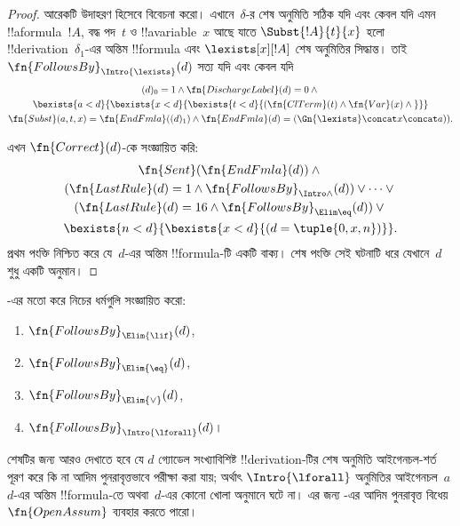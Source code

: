 \documentclass[../../../include/open-logic-section]{subfiles}
\begin{document}
\begin{proof}
  আরেকটি উদাহরণ হিসেবে \Intro{\lexists} বিবেচনা করো। এখানে~$\delta$-র শেষ
  অনুমিতি সঠিক যদি এবং কেবল যদি এমন !!a{formula}~$!A$, বদ্ধ পদ~$t$ ও
  !!a{variable}~$x$ আছে যাতে $\Subst{!A}{t}{x}$ হলো
  !!{derivation}~$\delta_1$-এর অন্তিম !!{formula} এবং $\lexists[x][!A]$ শেষ
  অনুমিতির সিদ্ধান্ত। তাই $\fn{FollowsBy}_{\Intro{\lexists}}(d)$ সত্য যদি এবং
  কেবল যদি
  \begin{multline*}
    (d)_0 = 1 \land \fn{DischargeLabel}(d) = 0 \land {} \\
    \bexists{a < d}{\bexists{x<d}{\bexists{t<d}{
          (\fn{ClTerm}(t) \land \fn{Var}(x)  \land {}}}}\\
    \fn{Subst}(a,t,x) = \fn{EndFmla}((d)_1) \land
    \fn{EndFmla}(d) = (\Gn{\lexists} \concat x \concat a)).
  \end{multline*}

  এখন $\fn{Correct}(d)$-কে সংজ্ঞায়িত করি:
  \begin{multline*}
    \fn{Sent}(\fn{EndFmla}(d)) \land {}\\
    (\fn{LastRule}(d) = 1 \land
    \fn{FollowsBy}_{\Intro\land}(d)) \lor \dots \lor {}\\
    (\fn{LastRule}(d) = 16 \land \fn{FollowsBy}_{\Elim\eq}(d)) \lor {}\\
    \bexists{n<d}{\bexists{x<d}{(d = \tuple{0, x, n})}}.
  \end{multline*}
  প্রথম পংক্তি নিশ্চিত করে যে~$d$-এর অন্তিম !!{formula}-টি একটি বাক্য। শেষ
  পংক্তি সেই ঘটনাটি ধরে যেখানে~$d$ শুধু একটি অনুমান।
\end{proof}

\begin{prob}
  -এর মতো করে নিচের ধর্মগুলি সংজ্ঞায়িত করো:
  \begin{enumerate}
  \item $\fn{FollowsBy}_{\Elim{\lif}}(d)$,
  \item $\fn{FollowsBy}_{\Elim{\eq}}(d)$,
  \item $\fn{FollowsBy}_{\Elim{\lor}}(d)$,
  \item $\fn{FollowsBy}_{\Intro{\lforall}}(d)$।
  \end{enumerate}
  শেষটির জন্য আরও দেখাতে হবে যে $d$ গ্যোডেল সংখ্যাবিশিষ্ট
  !!{derivation}-টির শেষ অনুমিতি আইগেনচল-শর্ত পূরণ করে কি না আদিম
  পুনরাবৃত্তভাবে পরীক্ষা করা যায়; অর্থাৎ $\Intro{\lforall}$ অনুমিতির
  আইগেনচল~$a$ $d$-এর অন্তিম !!{formula}-তে অথবা~$d$-এর কোনো খোলা
  অনুমানে ঘটে না। এর জন্য
  -এর আদিম পুনরাবৃত্ত বিধেয়
  $\fn{OpenAssum}$ ব্যবহার করতে পারো।
\end{prob}
\end{document}
